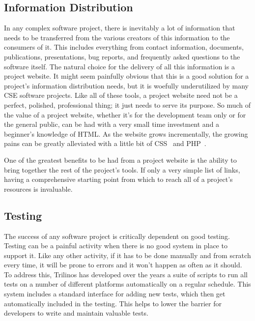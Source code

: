 \documentclass{doublecol}
\begin{document}
\subsection{Information Distribution}


In any complex software project, there is inevitably a lot of
information that needs to be transferred from the various creators
of this information to the consumers of it.  This includes
everything from contact information, documents, publications,
presentations, bug reports, and frequently asked questions to the
software itself.  The natural choice for the delivery of all this
information is a project website.  It might seem painfully obvious
that this is a good solution for a project's information
distribution needs, but it is woefully underutilized by many CSE
software projects.  Like all of these tools, a project website need
not be a perfect, polished, professional thing; it just needs to
serve its purpose.  So much of the value of a project website,
whether it's for the development team only or for the general
public, can be had with a very small time investment and a
beginner's knowledge of HTML.  As the website grows incrementally,
the growing pains can be greatly alleviated with a little bit of
CSS~\cite{CSS} and PHP~\cite{PHP}.

One of the greatest benefits to be had from a project website is the
ability to bring together the rest of the project's tools.  If only
a very simple list of links, having a comprehensive starting point
from which to reach all of a project's resources is invaluable.

\subsection{Testing}


The success of any software project is critically dependent on good
testing. Testing can be a painful activity when there is no good
system in place to support it.  Like any other activity, if it has
to be done manually and from scratch every time, it will be prone to
errors and it won't happen as often as it should.  To address this,
Trilinos has developed over the years a suite of scripts to run all
tests on a number of different platforms automatically on a regular
schedule.  This system includes a standard interface for adding new
tests, which then get automatically included in the testing.  This
helps to lower the barrier for developers to write and maintain
valuable tests.
\end{document}
